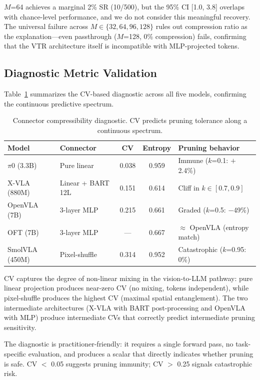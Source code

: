 \documentclass[letterpaper]{article}
\begin{document}
$M$=64 achieves a marginal 2\% SR (10/500), but the 95\% CI [1.0, 3.8] overlaps with chance-level performance, and we do not consider this meaningful recovery.
The universal failure across $M \in \{32, 64, 96, 128\}$ rules out compression ratio as the explanation---even passthrough ($M$=128, 0\% compression) fails, confirming that the VTR architecture itself is incompatible with MLP-projected tokens.

\subsection{Diagnostic Metric Validation}
\label{sec:diagnostic_results}

Table~\ref{tab:diagnostic} summarizes the CV-based diagnostic across all five models, confirming the continuous predictive spectrum.

\begin{table}[h]
\centering
\caption{Connector compressibility diagnostic. CV predicts pruning tolerance along a continuous spectrum.}
\label{tab:diagnostic}
\begin{tabular}{llccl}
\toprule
\textbf{Model} & \textbf{Connector} & \textbf{CV} & \textbf{Entropy} & \textbf{Pruning behavior} \\
\midrule
$\pi$0 (3.3B) & Pure linear & 0.038 & 0.959 & Immune ($k$=0.1: $+$2.4\%) \\
X-VLA (880M) & Linear + BART 12L & 0.151 & 0.614 & Cliff in $k \in [0.7, 0.9]$ \\
OpenVLA (7B) & 3-layer MLP & 0.215 & 0.661 & Graded ($k$=0.5: $-$49\%) \\
OFT (7B) & 3-layer MLP & --- & 0.667 & $\approx$ OpenVLA (entropy match) \\
SmolVLA (450M) & Pixel-shuffle & 0.314 & 0.952 & Catastrophic ($k$=0.95: 0\%) \\
\bottomrule
\end{tabular}
\end{table}

CV captures the degree of non-linear mixing in the vision-to-LLM pathway: pure linear projection produces near-zero CV (no mixing, tokens independent), while pixel-shuffle produces the highest CV (maximal spatial entanglement).
The two intermediate architectures (X-VLA with BART post-processing and OpenVLA with MLP) produce intermediate CVs that correctly predict intermediate pruning sensitivity.

The diagnostic is practitioner-friendly: it requires a single forward pass, no task-specific evaluation, and produces a scalar that directly indicates whether pruning is safe.
CV $<$ 0.05 suggests pruning immunity; CV $>$ 0.25 signals catastrophic risk.
\end{document}
